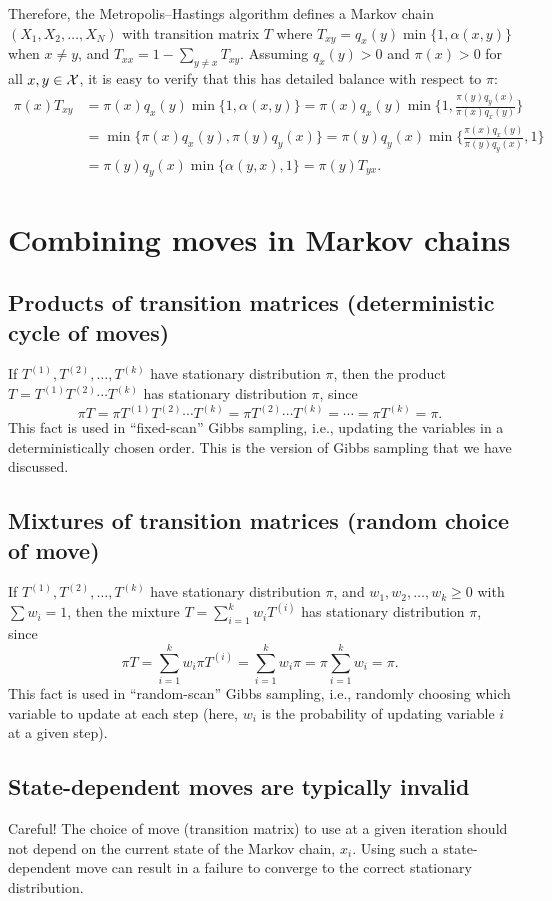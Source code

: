 \documentclass[12pt]{article}
\begin{document}
Therefore, the Metropolis--Hastings algorithm defines a Markov chain $(X_1,X_2,\ldots,X_N)$ with transition matrix $T$ where
$T_{x y} = q_x(y)\min\{1,\alpha(x,y)\}$ when $x\neq y$, and $T_{x x} = 1-\sum_{y\neq x} T_{x y}$. 
Assuming $q_x(y)>0$ and $\pi(x)>0$ for all $x,y\in\mathcal{X}$, it is easy to verify that this has detailed balance with respect to $\pi$:
\begin{align*}
\pi(x) T_{x y} & = \pi(x)q_x(y)\min\{1,\alpha(x,y)\} = \pi(x)q_x(y)\min\Big\{1,\frac{\pi(y)q_y(x)}{\pi(x)q_x(y)}\Big\} \\
&= \min\{\pi(x)q_x(y),\pi(y)q_y(x)\} = \pi(y)q_y(x)\min\Big\{\frac{\pi(x)q_x(y)}{\pi(y)q_y(x)},1\Big\} \\
&= \pi(y)q_y(x)\min\{\alpha(y,x),1\} = \pi(y)T_{y x}.
\end{align*}



\section*{Combining moves in Markov chains}

\subsection*{Products of transition matrices (deterministic cycle of moves)}
If $T^{(1)},T^{(2)},\ldots,T^{(k)}$ have stationary distribution $\pi$, then the product $T = T^{(1)}T^{(2)}\cdots T^{(k)}$ has stationary distribution $\pi$,
since
$$ \pi T = \pi  T^{(1)}T^{(2)}\cdots T^{(k)} = \pi  T^{(2)}\cdots T^{(k)} = \cdots = \pi T^{(k)} = \pi.$$
This fact is used in ``fixed-scan'' Gibbs sampling, i.e., updating the variables in a deterministically chosen order. This is the version of Gibbs sampling that we have discussed.

\subsection*{Mixtures of transition matrices (random choice of move)}
If $T^{(1)},T^{(2)},\ldots,T^{(k)}$ have stationary distribution $\pi$, and $w_1,w_2,\ldots,w_k\geq 0$ with $\sum w_i = 1$, then the mixture $T = \sum_{i = 1}^k w_i T^{(i)}$ has stationary distribution $\pi$,
since
$$ \pi T = \sum_{i = 1}^k w_i \pi T^{(i)} = \sum_{i = 1}^k w_i \pi  = \pi \sum_{i = 1}^k w_i = \pi.$$
This fact is used in ``random-scan'' Gibbs sampling, i.e., randomly choosing which variable to update at each step (here, $w_i$ is the probability of updating variable $i$ at a given step).

\subsection*{State-dependent moves are typically invalid}

Careful! The choice of move (transition matrix) to use at a given iteration should not depend on the current state of the Markov chain, $x_i$.
Using such a state-dependent move can result in a failure to converge to the correct stationary distribution.
\end{document}
